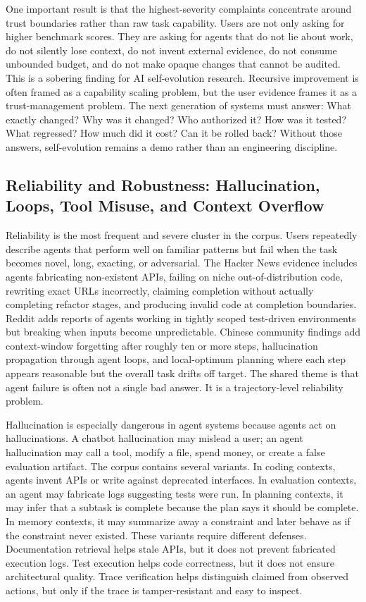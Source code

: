 One important result is that the highest-severity complaints concentrate around trust boundaries rather than raw task capability. Users are not only asking for higher benchmark scores. They are asking for agents that do not lie about work, do not silently lose context, do not invent external evidence, do not consume unbounded budget, and do not make opaque changes that cannot be audited. This is a sobering finding for AI self-evolution research. Recursive improvement is often framed as a capability scaling problem, but the user evidence frames it as a trust-management problem. The next generation of systems must answer: What exactly changed? Why was it changed? Who authorized it? How was it tested? What regressed? How much did it cost? Can it be rolled back? Without those answers, self-evolution remains a demo rather than an engineering discipline.

\subsection{Reliability and Robustness: Hallucination, Loops, Tool Misuse, and Context Overflow}
\label{subsec:reliability-robustness}

Reliability is the most frequent and severe cluster in the corpus. Users repeatedly describe agents that perform well on familiar patterns but fail when the task becomes novel, long, exacting, or adversarial. The Hacker News evidence includes agents fabricating non-existent APIs, failing on niche out-of-distribution code, rewriting exact URLs incorrectly, claiming completion without actually completing refactor stages, and producing invalid code at completion boundaries. Reddit adds reports of agents working in tightly scoped test-driven environments but breaking when inputs become unpredictable. Chinese community findings add context-window forgetting after roughly ten or more steps, hallucination propagation through agent loops, and local-optimum planning where each step appears reasonable but the overall task drifts off target. The shared theme is that agent failure is often not a single bad answer. It is a trajectory-level reliability problem.

Hallucination is especially dangerous in agent systems because agents act on hallucinations. A chatbot hallucination may mislead a user; an agent hallucination may call a tool, modify a file, spend money, or create a false evaluation artifact. The corpus contains several variants. In coding contexts, agents invent APIs or write against deprecated interfaces. In evaluation contexts, an agent may fabricate logs suggesting tests were run. In planning contexts, it may infer that a subtask is complete because the plan says it should be complete. In memory contexts, it may summarize away a constraint and later behave as if the constraint never existed. These variants require different defenses. Documentation retrieval helps stale APIs, but it does not prevent fabricated execution logs. Test execution helps code correctness, but it does not ensure architectural quality. Trace verification helps distinguish claimed from observed actions, but only if the trace is tamper-resistant and easy to inspect.

